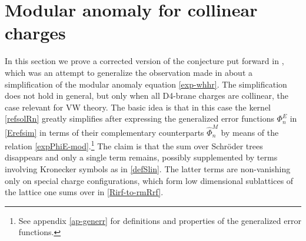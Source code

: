 \documentclass[12pt,letterpaper]{JHEP3}
\def\hPhi{\hat\Phi}
\begin{document}
\section{Modular anomaly for collinear charges}
\label{sec-collinear}

In this section we prove a corrected version of the conjecture put forward in \cite{Alexandrov:2025sig},
which was an attempt to generalize the observation made in \cite{Pioline:2025xgf} 
about a simplification of the modular anomaly equation \eqref{exp-whhr}. 
The simplification does not hold in general, but only when all D4-brane charges are collinear, the case relevant for VW theory.
The basic idea is that in this case the kernel \eqref{refsolRn} greatly simplifies after expressing 
the generalized error functions $\Phi_n^E$ in \eqref{Erefsim}
in terms of their complementary counterparts $\hPhi^M_n$ by means of the relation \eqref{expPhiE-mod}.\footnote{See appendix \ref{ap-generr} 
	for definitions and properties of the generalized error functions.}
The claim is that the sum over Schr\"oder trees disappears and only a single term remains, possibly supplemented
by terms involving Kronecker symbols as in \eqref{defSlin}. The latter terms are non-vanishing only on special charge configurations,
which form low dimensional sublattices of the lattice one sums over in \eqref{Rirf-to-rmRrf}.
\end{document}
